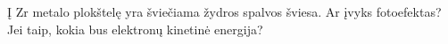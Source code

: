 \question Į Zr metalo plokštelę yra šviečiama žydros spalvos šviesa. Ar įvyks fotoefektas? Jei taip, kokia bus elektronų kinetinė energija?